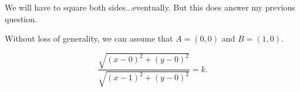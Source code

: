 









We will have to square both sides...eventually. But this does answer my previous question.









Without loss of generality, we can assume that $A = (0,0)$ and $B = (1,0)$.

$$  
\frac{\sqrt{(x-0)^2 + (y-0)^2}}{\sqrt{(x-1)^2 + (y-0)^2}} = k.$$

